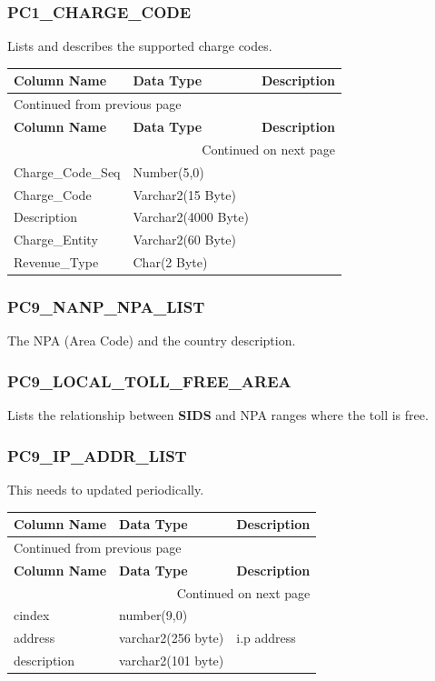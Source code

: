 \documentclass[12pt,twoside]{article}
\begin{document}
\subsubsection{PC1\_CHARGE\_CODE}
\label{sec:orgheadline121}
Lists and describes the supported charge codes.
\footnotesize

\begin{longtable}{l|l|l}
\hline
\textbf{Column Name} & \textbf{Data Type} & \textbf{Description}\\
\hline
\endfirsthead
\multicolumn{3}{l}{Continued from previous page} \\
\hline

\textbf{Column Name} & \textbf{Data Type} & \textbf{Description} \\

\hline
\endhead
\hline\multicolumn{3}{r}{Continued on next page} \\
\endfoot
\endlastfoot
\hline
Charge\_Code\_Seq & Number(5,0) & \\
Charge\_Code & Varchar2(15 Byte) & \\
Description & Varchar2(4000 Byte) & \\
Charge\_Entity & Varchar2(60 Byte) & \\
Revenue\_Type & Char(2 Byte) & \\
\hline
\end{longtable}

\normalsize
\subsubsection{PC9\_NANP\_NPA\_LIST}
\label{sec:orgheadline122}
The NPA (Area Code) and the country description.
\subsubsection{PC9\_LOCAL\_TOLL\_FREE\_AREA}
\label{sec:orgheadline123}
Lists the relationship between \textbf{SIDS} and NPA ranges where
the toll is free.
\subsubsection{PC9\_IP\_ADDR\_LIST}
\label{sec:orgheadline124}
This needs to updated periodically.
\footnotesize

\begin{longtable}{l|l|l}
\hline
\textbf{Column Name} & \textbf{Data Type} & \textbf{Description}\\
\hline
\endfirsthead
\multicolumn{3}{l}{Continued from previous page} \\
\hline

\textbf{Column Name} & \textbf{Data Type} & \textbf{Description} \\

\hline
\endhead
\hline\multicolumn{3}{r}{Continued on next page} \\
\endfoot
\endlastfoot
\hline
cindex & number(9,0) & \\
address & varchar2(256 byte) & i.p address\\
description & varchar2(101 byte) & \\
\hline
\end{longtable}
\normalsize
\end{document}
